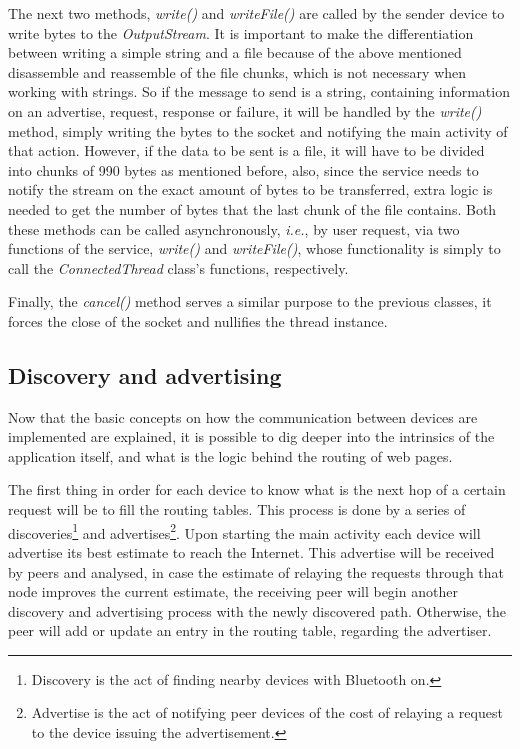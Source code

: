 The next two methods, \textit{write()} and \textit{writeFile()} are called by the sender device to write bytes to the \textit{OutputStream}. It is important to make the differentiation between writing a simple string and a file because of the above mentioned disassemble and reassemble of the file chunks, which is not necessary when working with strings. So if the message to send is a string, containing information on an advertise, request, response or failure, it will be handled by the \textit{write()} method, simply writing the bytes to the socket and notifying the main activity of that action. However, if the data to be sent is a file, it will have to be divided into chunks of 990 bytes as mentioned before, also, since the service needs to notify the stream on the exact amount of bytes to be transferred, extra logic is needed to get the number of bytes that the last chunk of the file contains. Both these methods can be called asynchronously, \textit{i.e.}, by user request, via two functions of the service, \textit{write()} and \textit{writeFile()}, whose functionality is simply to call the \textit{ConnectedThread} class's functions, respectively.

Finally, the \textit{cancel()} method serves a similar purpose to the previous classes, it forces the close of the socket and nullifies the thread instance.

\subsection{Discovery and advertising}
\label{subsec:disandadv}

Now that the basic concepts on how the communication between devices are implemented are explained, it is possible to dig deeper into the intrinsics of the application itself, and what is the logic behind the routing of web pages.

The first thing in order for each device to know what is the next hop of a certain request will be to fill the routing tables. This process is done by a series of discoveries\footnote{Discovery is the act of finding nearby devices with Bluetooth on.} and advertises\footnote{Advertise is the act of notifying peer devices of the cost of relaying a request to the device issuing the advertisement.}. Upon starting the main activity each device will advertise its best estimate to reach the Internet. This advertise will be received by peers and analysed, in case the estimate of relaying the requests through that node improves the current estimate, the receiving peer will begin another discovery and advertising process with the newly discovered path. Otherwise, the peer will add or update an entry in the routing table, regarding the advertiser.

